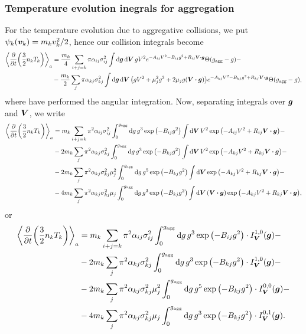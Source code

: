 \documentclass[aps,prl,preprint,groupedaddress,10pt]{revtex4-2}
\begin{document}
\subsubsection{Temperature evolution inegrals for aggregation}
For the temperature evolution due to aggregative collisions, we put $\psi_k(\vb*{v}_k)=m_kv_k^2/2$, hence
our collision integrals become
\begin{equation}
    \begin{split}
        \avg{\pdv{t}\pqty{\frac{3}{2}n_k T_k}}_a&=\frac{m_k}{4}\sum_{i+j=k}\pi\alpha_{ij}\sigma_{ij}^2
        \int\dd{\bg}\dd{\bV}gV^2e^{-A_{ij}V^2-B_{ij}g^2+R_{ij}\bV\vdot\bg}\Theta(\ltx{g}{agg}-g)-\\
        &-\frac{m_k}{2}\sum_{j}\pi\alpha_{kj}\sigma_{kj}^2\int\dd{\bg}\dd{\bV}
        \pqty{gV^2+\mu_j^2g^3+2\mu_jg\pqty{\bV\vdot\bg}}
        e^{-A_{kj}V^2-B_{kj}g^2+R_{kj}\bV\vdot\bg}\Theta(\ltx{g}{agg}-g),\\
    \end{split}
\end{equation}
where have performed the angular integration. Now, separating integrals over $\vb*{g}$ and $\vb*{V}$, we write
\begin{equation}
    \begin{split}
        \avg{\pdv{t}\pqty{\frac{3}{2}n_k T_k}}_a&=m_k\sum_{i+j=k}\pi^2\alpha_{ij}\sigma_{ij}^2
        \int_{0}^{\ltx{g}{agg}}\dd{g}g^3\exp\pqty{-B_{ij}g^2}
        \int\dd{\bV}V^2\exp\pqty{-A_{ij}V^2+R_{ij}\bV\vdot\bg}-\\
        &-2m_k\sum_{j}\pi^2\alpha_{kj}\sigma_{kj}^2
        \int_{0}^{\ltx{g}{agg}}\dd{g}g^3\exp\pqty{-B_{kj}g^2}
        \int\dd{\bV}V^2\exp\pqty{-A_{kj}V^2+R_{kj}\bV\vdot\bg}-\\
        &-2m_k\sum_{j}\pi^2\alpha_{kj}\sigma_{kj}^2\mu_j^2
        \int_{0}^{\ltx{g}{agg}}\dd{g}g^5\exp\pqty{-B_{kj}g^2}
        \int\dd{\bV}\exp\pqty{-A_{kj}V^2+R_{kj}\bV\vdot\bg}-\\
        &-4m_k\sum_{j}\pi^2\alpha_{kj}\sigma_{kj}^2\mu_j
        \int_{0}^{\ltx{g}{agg}}\dd{g}g^3\exp\pqty{-B_{kj}g^2}
        \int\dd{\bV}\pqty{\bV\vdot\bg}\exp\pqty{-A_{kj}V^2+R_{kj}\bV\vdot\bg},
    \end{split}
\end{equation}
or
\begin{equation}
    \begin{split}
        \avg{\pdv{t}\pqty{\frac{3}{2}n_k T_k}}_a&=m_k\sum_{i+j=k}\pi^2\alpha_{ij}\sigma_{ij}^2
        \int_{0}^{\ltx{g}{agg}}\dd{g}g^3\exp\pqty{-B_{ij}g^2}\cdot I_{\bV}^{1,0}(\bg)-\\
        &-2m_k\sum_{j}\pi^2\alpha_{kj}\sigma_{kj}^2
        \int_{0}^{\ltx{g}{agg}}\dd{g}g^3\exp\pqty{-B_{kj}g^2}\cdot I_{\bV}^{1,0}(\bg)-\\
        &-2m_k\sum_{j}\pi^2\alpha_{kj}\sigma_{kj}^2\mu_j^2
        \int_{0}^{\ltx{g}{agg}}\dd{g}g^5\exp\pqty{-B_{kj}g^2}\cdot I_{\bV}^{0,0}(\bg)-\\
        &-4m_k\sum_{j}\pi^2\alpha_{kj}\sigma_{kj}^2\mu_j
        \int_{0}^{\ltx{g}{agg}}\dd{g}g^3\exp\pqty{-B_{kj}g^2}\cdot I_{\bV}^{0,1}(\bg).
    \end{split}
\end{equation}
\end{document}

